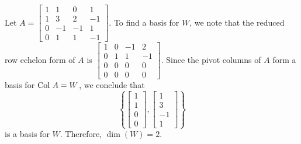 \begin{example}
\item Let $A = \left[ \begin{array}{crrr} 1&1&0&1\\1&3&2&-1\\0&-1&-1&1\\0&1&1&-1 \end{array}\right]$. To find a basis for $W$, we note that the reduced row echelon form of $A$ is $\left[ \begin{array}{ccrr} 1&0&-1&2\\0&1&1&-1\\0&0&0&0\\0&0&0&0 \end{array}\right]$. Since the pivot columns of $A$ form a basis for $\text{Col } A = W$, we conclude that 
\[\left\{ \left[ \begin{array}{c} 1\\1\\0\\0 \end{array}\right], \left[ \begin{array}{r} 1\\3\\-1\\1 \end{array}\right] \right\}\]
is a basis for $W$. Therefore, $\dim(W) = 2$. 

\ea


\end{example}

